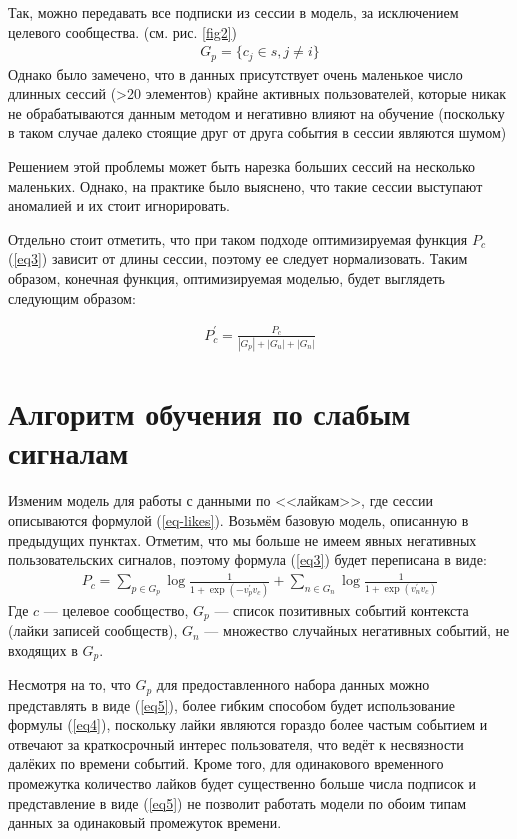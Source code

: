 \documentclass[times,specification,annotation]{itmo-student-thesis}
\begin{document}
Так, можно передавать все подписки из сессии в модель, за исключением целевого сообщества. (см. рис. \ref{fig2})
\begin{align}
G_p =\{c_j \in s, j \ne i\} \label{eq5}
\end{align}
Однако было замечено, что в данных присутствует очень маленькое число длинных сессий (>20 элементов) крайне активных пользователей, которые никак не обрабатываются данным методом и негативно
влияют на обучение (поскольку в таком случае далеко стоящие друг от друга
события в сессии являются шумом)

Решением этой проблемы может быть нарезка больших
сессий на несколько маленьких. Однако, на практике было выяснено, что такие сессии выступают аномалией и их стоит игнорировать. 

Отдельно стоит отметить, что при таком подходе оптимизируемая функция $P_c$ (\ref{eq3}) зависит от длины сессии, поэтому ее следует нормализовать. Таким образом, конечная функция, оптимизируемая моделью, будет выглядеть следующим образом: 

\begin{align}
P_c^{'} = \frac{P_c}{|G_p| + |G_u| + |G_n|} \label{eq6}
\end{align}

\section{Алгоритм обучения по слабым сигналам}\label{sec:algo-likes}

Изменим модель для работы с данными по <<лайкам>>, где сессии описываются формулой (\ref{eq-likes}). Возьмём базовую модель, описанную в предыдущих пунктах. Отметим, что мы больше не имеем явных негативных пользовательских сигналов, поэтому формула (\ref{eq3}) будет переписана в виде:
\begin{align}
P_c = \sum_{p \in G_p} \log \frac{1}{1 + \exp(-v_p^{'}v_c)} + \sum_{n \in G_n} \log \frac{1}{1 + \exp(v_n^{'}v_c)} \label{eq7}
 \end{align}
Где $c$ --- целевое сообщество, $G_p$ --- список позитивных событий
контекста (лайки записей сообществ), $G_n$ --- множество случайных негативных событий, не входящих в $G_p$. 

Несмотря на то, что $G_p$ для предоставленного набора данных можно представлять в виде (\ref{eq5}), более гибким способом будет использование формулы (\ref{eq4}), поскольку лайки являются гораздо более частым событием и отвечают за краткосрочный интерес пользователя, что ведёт к несвязности далёких по времени событий. Кроме того, для одинакового временного промежутка количество лайков будет существенно больше числа подписок и представление в виде (\ref{eq5}) не позволит работать модели по обоим типам данных за одинаковый промежуток времени. 
\end{document}
